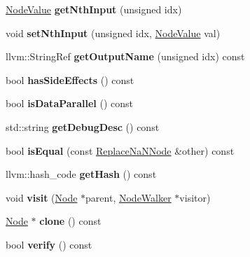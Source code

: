 \begin{DoxyCompactItemize}
\item 
\mbox{\label{classglow_1_1_replace_na_n_node_a269b00615d97c748cedc5733e4bf6adc}} 
\hyperlink{structglow_1_1_node_value}{Node\+Value} {\bfseries get\+Nth\+Input} (unsigned idx)
\item 
\mbox{\label{classglow_1_1_replace_na_n_node_a9dfedf89b31cbcc2d528d934b113cba0}} 
void {\bfseries set\+Nth\+Input} (unsigned idx, \hyperlink{structglow_1_1_node_value}{Node\+Value} val)
\item 
\mbox{\label{classglow_1_1_replace_na_n_node_a9eb4e8d388a56dfaf0b8909a304043c0}} 
llvm\+::\+String\+Ref {\bfseries get\+Output\+Name} (unsigned idx) const
\item 
\mbox{\label{classglow_1_1_replace_na_n_node_ac293ce55a7bfbf70e235b4f0de93c5e7}} 
bool {\bfseries has\+Side\+Effects} () const
\item 
\mbox{\label{classglow_1_1_replace_na_n_node_a91dd49e7a948aec154282c08d149d5a1}} 
bool {\bfseries is\+Data\+Parallel} () const
\item 
\mbox{\label{classglow_1_1_replace_na_n_node_a2487b4045107496bf8acf0d8629be167}} 
std\+::string {\bfseries get\+Debug\+Desc} () const
\item 
\mbox{\label{classglow_1_1_replace_na_n_node_aac4d556713b6d4f2df4bcf44c99c35c9}} 
bool {\bfseries is\+Equal} (const \hyperlink{classglow_1_1_replace_na_n_node}{Replace\+Na\+N\+Node} \&other) const
\item 
\mbox{\label{classglow_1_1_replace_na_n_node_ae4565bb695ccfbf0aacabab332c90f22}} 
llvm\+::hash\+\_\+code {\bfseries get\+Hash} () const
\item 
\mbox{\label{classglow_1_1_replace_na_n_node_aebd9b4f5f2e99936ed581a49a37c21e7}} 
void {\bfseries visit} (\hyperlink{classglow_1_1_node}{Node} $\ast$parent, \hyperlink{classglow_1_1_node_walker}{Node\+Walker} $\ast$visitor)
\item 
\mbox{\label{classglow_1_1_replace_na_n_node_a4699260f017403d99e83c4f98a0ec23e}} 
\hyperlink{classglow_1_1_node}{Node} $\ast$ {\bfseries clone} () const
\item 
\mbox{\label{classglow_1_1_replace_na_n_node_ad78b5565346c93c5c8cccfbe10840449}} 
bool {\bfseries verify} () const
\end{DoxyCompactItemize}
